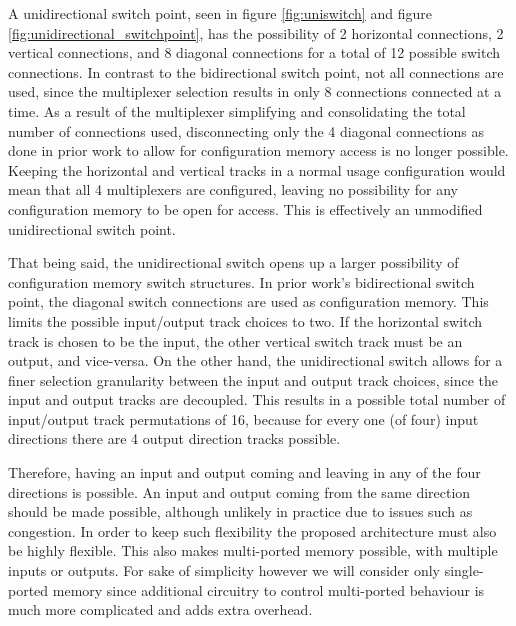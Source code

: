 A unidirectional switch point, seen in figure \ref{fig:uniswitch} and figure \ref{fig:unidirectional_switchpoint}, has the possibility of 2 horizontal connections, 2 vertical connections, and 8 diagonal connections for a total of 12 possible switch connections. In contrast to the bidirectional switch point, not all connections are used, since the multiplexer selection results in only 8 connections connected at a time. As a result of the multiplexer simplifying and consolidating the total number of connections used, disconnecting only the 4 diagonal connections as done in prior work to allow for configuration memory access is no longer possible. Keeping the horizontal and vertical tracks in a normal usage configuration would mean that all 4 multiplexers are configured, leaving no possibility for any configuration memory to be open for access. This is effectively an unmodified unidirectional switch point. 


That being said, the unidirectional switch opens up a larger possibility of configuration memory switch structures. In prior work's bidirectional switch point, the diagonal switch connections are used as configuration memory.
This limits the possible input/output track choices to two. If the horizontal switch track is chosen to be the input, the other vertical switch track must be an output, and vice-versa.
On the other hand, the unidirectional switch allows for a finer selection granularity between the input and output track choices, since the input and output tracks are decoupled. This results in a possible total number of input/output track permutations of 16, because for every one (of four) input directions there are 4 output direction tracks possible. 

Therefore, having an input and output coming and leaving in any of the four directions is possible. An input and output coming from the same direction should be made possible, although unlikely in practice due to issues such as congestion. In order to keep such flexibility the proposed architecture must also be highly flexible. This also makes multi-ported memory possible, with multiple inputs or outputs. For sake of simplicity however we will consider only single-ported memory since additional circuitry to control multi-ported behaviour is much more complicated and adds extra overhead.

